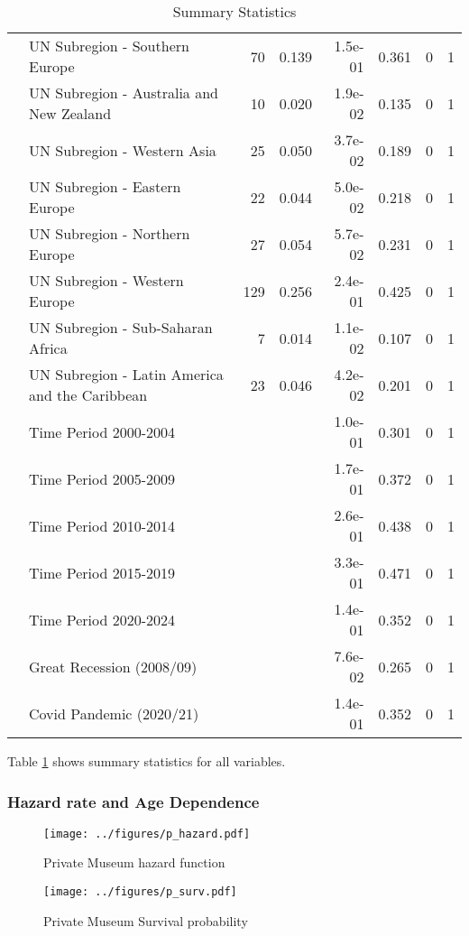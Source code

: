 \documentclass[12pt]{article}
\begin{document}
\begin{table}[ht]
\begin{tabular}{llrrrrrr}
   & UN Subregion - Southern Europe & 70 & 0.139 &  1.5e-01 &  0.361 & 0 & 1 \\ 
   & UN Subregion - Australia and New Zealand & 10 & 0.020 &  1.9e-02 &  0.135 & 0 & 1 \\ 
   & UN Subregion - Western Asia & 25 & 0.050 &  3.7e-02 &  0.189 & 0 & 1 \\ 
   & UN Subregion - Eastern Europe & 22 & 0.044 &  5.0e-02 &  0.218 & 0 & 1 \\ 
   & UN Subregion - Northern Europe & 27 & 0.054 &  5.7e-02 &  0.231 & 0 & 1 \\ 
   & UN Subregion - Western Europe & 129 & 0.256 &  2.4e-01 &  0.425 & 0 & 1 \\ 
   & UN Subregion - Sub-Saharan Africa & 7 & 0.014 &  1.1e-02 &  0.107 & 0 & 1 \\ 
   & UN Subregion - Latin America and the Caribbean & 23 & 0.046 &  4.2e-02 &  0.201 & 0 & 1 \\ 
   & Time Period 2000-2004 &  &  &  1.0e-01 &  0.301 & 0 & 1 \\ 
   & Time Period 2005-2009 &  &  &  1.7e-01 &  0.372 & 0 & 1 \\ 
   & Time Period 2010-2014 &  &  &  2.6e-01 &  0.438 & 0 & 1 \\ 
   & Time Period 2015-2019 &  &  &  3.3e-01 &  0.471 & 0 & 1 \\ 
   & Time Period 2020-2024 &  &  &  1.4e-01 &  0.352 & 0 & 1 \\ 
   & Great Recession (2008/09) &  &  &  7.6e-02 &  0.265 & 0 & 1 \\ 
   & Covid Pandemic (2020/21) &  &  &  1.4e-01 &  0.352 & 0 & 1 \\ 
   \hline
\end{tabular}
\caption{Summary Statistics} 
\label{tbl:t_sumstats}
\end{table}

Table \ref{tbl:t_sumstats} shows summary statistics for all variables.
\subsubsection*{Hazard rate and Age Dependence}


\begin{figure}[htbp]
\centering
\texttt{[image: ../figures/p\_hazard.pdf]}
\caption{\label{fig:p_hazard}Private Museum hazard function}
\end{figure}

\begin{figure}[htbp]
\centering
\texttt{[image: ../figures/p\_surv.pdf]}
\caption{\label{fig:p_surv}Private Museum Survival probability}
\end{figure}
\end{document}
